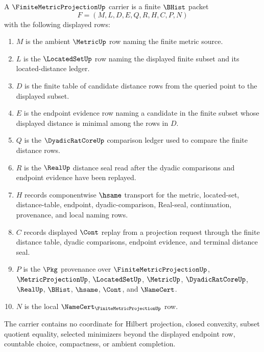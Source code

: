 \begin{definition}
\label{def:finite-metric-projection-carrier}
A $\FiniteMetricProjectionUp$ carrier is a finite $\BHist$ packet
$$
F=(M,L,D,E,Q,R,H,C,P,N)
$$
with the following displayed rows:
\begin{enumerate}
\item $M$ is the ambient $\MetricUp$ row naming the finite metric source.
\item $L$ is the $\LocatedSetUp$ row naming the displayed finite subset and its located-distance ledger.
\item $D$ is the finite table of candidate distance rows from the queried point to the displayed subset.
\item $E$ is the endpoint evidence row naming a candidate in the finite subset whose displayed distance is minimal among the rows in $D$.
\item $Q$ is the $\DyadicRatCoreUp$ comparison ledger used to compare the finite distance rows.
\item $R$ is the $\RealUp$ distance seal read after the dyadic comparisons and endpoint evidence have been replayed.
\item $H$ records componentwise $\hsame$ transport for the metric, located-set, distance-table, endpoint, dyadic-comparison, Real-seal, continuation, provenance, and local naming rows.
\item $C$ records displayed $\Cont$ replay from a projection request through the finite distance table, dyadic comparisons, endpoint evidence, and terminal distance seal.
\item $P$ is the $\Pkg$ provenance over $\FiniteMetricProjectionUp$, $\MetricProjectionUp$, $\LocatedSetUp$, $\MetricUp$, $\DyadicRatCoreUp$, $\RealUp$, $\BHist$, $\hsame$, $\Cont$, and $\NameCert$.
\item $N$ is the local $\NameCert_{\FiniteMetricProjectionUp}$ row.
\end{enumerate}
The carrier contains no coordinate for Hilbert projection, closed convexity, subset quotient equality, selected minimizers beyond the displayed endpoint row, countable choice, compactness, or ambient completion.
\end{definition}

